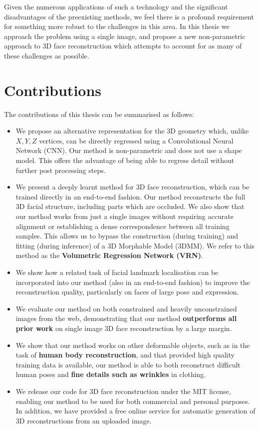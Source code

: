 Given the numerous applications of such a technology and the
significant disadvantages of the preexisting methods, we feel there is
a profound requirement for something more robust to the challenges in
this area. In this thesis we approach the problem using a single
image, and propose a new non-parametric approach to 3D face
reconstruction which attempts to account for as many of these
challenges as possible.

\section{Contributions}

The contributions of this thesis can be summarised as follows:

\begin{itemize}
\item %
  We propose an alternative representation for the 3D geometry which,
  unlike $X, Y, Z$ vertices, can be directly regressed using a
  Convolutional Neural Network (CNN). Our method is non-parametric and
  does not use a shape model. This offers the advantage of being able
  to regress detail without further post processing steps.

\item %
  We present a deeply learnt method for 3D face reconstruction, which
  can be trained directly in an end-to-end fashion. Our method
  reconstructs the full 3D facial structure, including parts which are
  occluded. We also show that our method works from just a single
  images without requiring accurate alignment or establishing a dense
  correspondence between all training samples.  This allows us to
  bypass the construction (during training) and fitting (during
  inference) of a 3D Morphable Model (3DMM).  We refer to this method
  as the \textbf{Volumetric Regression Network (VRN)}.

\item We show how a related task of facial landmark localisation can
  be incorporated into our method (also in an end-to-end fashion) to
  improve the reconstruction quality, particularly on faces of large
  pose and expression.

\item We evaluate our method on both constrained and heavily
  unconstrained images from the web, demonstrating that our method
  \textbf{outperforms all prior work} on single image 3D face
  reconstruction by a large margin.

\item We show that our method works on other deformable objects, such
  as in the task of \textbf{human body reconstruction}, and that
  provided high quality training data is available, our method is able
  to both reconstruct difficult human poses and \textbf{fine details
    such as wrinkles} in clothing.

\item We release our code for 3D face reconstruction under the MIT
  license, enabling our method to be used for both commercial and
  personal purposes. In addition, we have provided a free online
  service for automatic generation of 3D reconstructions from an
  uploaded image.
\end{itemize}


